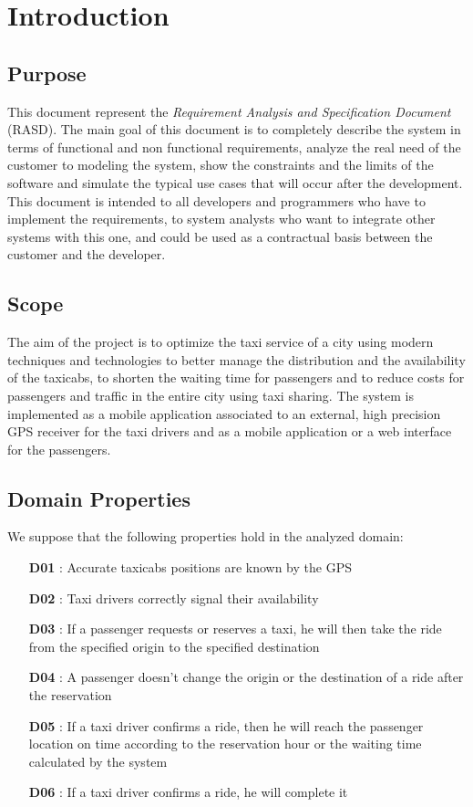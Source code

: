 \chapter{Introduction} \label{chap1}

\section{Purpose}
This document represent the \textit{Requirement Analysis and Specification Document} (RASD). The main goal of this document is to completely describe the system in terms of functional and non functional requirements, analyze the real need of the customer to modeling the system, show the constraints and the limits of the software and simulate the typical use cases that will occur after the development. This document is intended to all developers and programmers who have to implement the requirements, to system analysts who want to integrate other systems with this one, and could be used as a contractual basis between the customer and the developer.

\section{Scope}
The aim of the project is to optimize the taxi service of a city using modern techniques and technologies to better manage the distribution and the availability of the taxicabs, to shorten the waiting time for passengers and to reduce costs for passengers and traffic in the entire city using taxi sharing. 
The system is implemented as a mobile application associated to an external, high precision GPS receiver for the taxi drivers and as a mobile application or a web interface for the passengers.

\section{Domain Properties}
\noindent We suppose that the following properties hold in the analyzed domain:
\begin{itemize}
	\item [\textbf{D01}] : Accurate taxicabs positions are known by the GPS
	\item [\textbf{D02}] : Taxi drivers correctly signal their availability
	\item [\textbf{D03}] : If a passenger requests or reserves a taxi, he will then take the ride from the specified origin to the specified destination
	\item [\textbf{D04}] : A passenger doesn't change the origin or the destination of a ride after the reservation
	\item [\textbf{D05}] : If a taxi driver confirms a ride, then he will reach the passenger location on time according to the reservation hour or the waiting time calculated by the system
	\item [\textbf{D06}] : If a taxi driver confirms a ride, he will complete it
\end{itemize}

